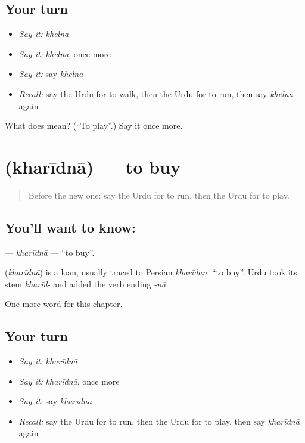 \subsection*{Your turn}
\begin{itemize}
\raggedright
  \item \emph{Say it:} \emph{khelnā}
  \item \emph{Say it:} \emph{khelnā}, once more
  \item \emph{Say it:} say \emph{khelnā}
  \item \emph{Recall:} say the Urdu for to walk, then the Urdu for to run, then say \emph{khelnā} again
\end{itemize}

\begin{tcolorbox}[breakable,colback=teal!4,colframe=teal!35!black,title={Before you move on}]
What does  mean? (\textquotedblleft{}To play\textquotedblright{}.) Say it once more.
\end{tcolorbox}
\section[\texorpdfstring{\ur{خریدنا} (kharīdnā)}{خریدنا (kharīdnā)}]{ (kharīdnā) — to buy}

\label{lesson:UR-C48-kharidna}



\begin{quote}
Before the new one: say the Urdu for to run, then the Urdu for to play.
\end{quote}

\subsection*{You'll want to know: }
\textbf{} — \emph{kharīdnā} — \textquotedblleft{}to buy\textquotedblright{}.

\begin{cousinweb}
\textbf{} (\emph{kharīdnā}) is a loan, usually traced to Persian \emph{kharīdan}, \textquotedblleft{}to buy\textquotedblright{}. Urdu took its stem \emph{kharīd-} and added the verb ending \emph{-nā}.
\end{cousinweb}

\begin{grammarlens}[title={What you've built}]
One more word for this chapter.
\end{grammarlens}

\subsection*{Your turn}
\begin{itemize}
\raggedright
  \item \emph{Say it:} \emph{kharīdnā}
  \item \emph{Say it:} \emph{kharīdnā}, once more
  \item \emph{Say it:} say \emph{kharīdnā}
  \item \emph{Recall:} say the Urdu for to run, then the Urdu for to play, then say \emph{kharīdnā} again
\end{itemize}

